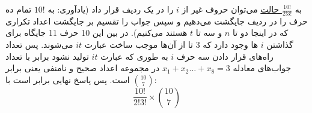 \p
به
\underline{$\frac{10!}{2!3!}$ حالت}
 می‌توان حروف غیر از
 $i$ را در یک ردیف قرار داد
(یادآوری: به 
$10!$
تمام ده حرف را در ردیف جایگشت می‌دهیم و سپس جواب را تقسیم بر جایگشت اعداد تکراری که در اینجا دو تا $n$ و سه تا $t$ هستند می‌کنیم).
در بین این 10 حرف 11 جایگاه برای گذاشتن $i$ ها وجود دارد که 3 تا از آن‌ها موجب ساخت عبارت $it$ می‌شوند.
پس تعداد راه‌های قرار دادن سه حرف $i$ به طوری که عبارت $it$ تولید نشود برابر با تعداد جواب‌های معادله
$x_1 + x_2 \ldots + x_8 = 3$
در مجموعه اعداد صحیح و نامنفی یعنی برابر
\underline{$\binom{10}{7}$}
است. پس پاسخ نهایی برابر است با:
$$\frac{10!}{2!3!}  \times \binom{10}{7}$$

